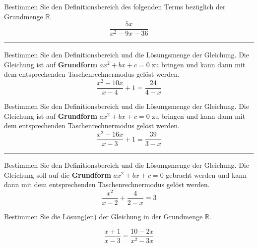




\usepackage{amssymb} %
\renewcommand{\metaHeaderLine}{Arbeitsblatt}
\renewcommand{\arbeitsblattTitel}{Bruchgleichungen (alte GESO Maturaaufgaben)}

\arbeitsblattHeader{}

Bestimmen Sie den Definitionsbereich des folgenden Terms bezüglich der Grundmenge $\mathbb{R}$.
$$\frac{5x}{x^2 - 9x - 36}$$

\vspace{2mm}
\hrule

Bestimmen Sie den Definitionsbereich und die Lösungsmenge der Gleichung.
Die Gleichung ist auf \textbf{Grundform}
$ax^2 + bx + c = 0$ zu bringen und kann dann
mit dem entsprechenden Taschenrechnermodus gelöst werden.
$$\frac{x^2-10x}{x-4} + 1 = \frac{24}{4-x}$$


\noTRAINER{\newpage}

Bestimmen Sie den Definitionsbereich und die Lösungsmenge der Gleichung.
Die Gleichung ist auf \textbf{Grundform} $ax^2 + bx + c = 0$ zu bringen und kann dann mit
dem entsprechenden Taschenrechnermodus gelöst werden.
$$\frac{x^2-16x}{x-3} + 1 = \frac{39}{3-x}$$
\vspace{2mm}

\hrule

Bestimmen Sie den Definitionsbereich und die Lösungsmenge der Gleichung.
Die Gleichung soll auf die \textbf{Grundform} $ax^2 + bx + c = 0$ gebracht werden und
kann dann mit dem entsprechenden Taschenrechnermodus gelöst werden.
$$\frac{x^2}{x-2} + \frac{4}{2-x} = 3$$


\noTRAINER{\newpage}

Bestimmen Sie die Lösung(en) der Gleichung in der Grundmenge $\mathbb{R}$.

$$\frac{x+1}{x-3} = \frac{10-2x}{x^2-3x}$$


